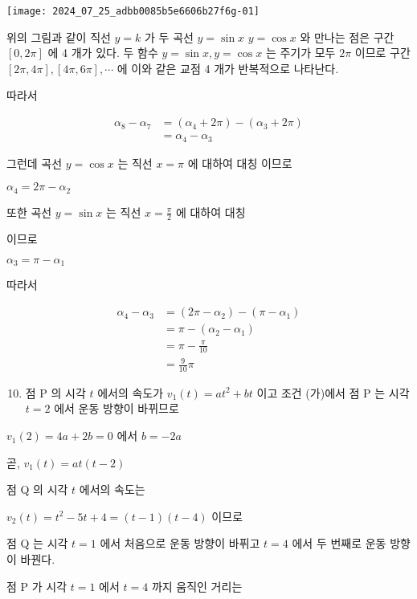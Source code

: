 \documentclass[10pt]{article}
\begin{document}
\begin{center}
\texttt{[image: 2024\_07\_25\_adbb0085b5e6606b27f6g-01]}
\end{center}

위의 그림과 같이 직선 $y=k$ 가 두 곡선 $y=\sin x$ $y=\cos x$ 와 만나는 점은 구간 $[0,2 \pi]$ 에 4 개가 있다. 두 함수 $y=\sin x, y=\cos x$ 는 주기가 모두 $2 \pi$ 이므로 구간 $[2 \pi, 4 \pi],[4 \pi, 6 \pi], \cdots$ 에 이와 같은 교점 4 개가 반복적으로 나타난다.

따라서

\[
\begin{aligned}
\alpha_{8}-\alpha_{7} & =\left(\alpha_{4}+2 \pi\right)-\left(\alpha_{3}+2 \pi\right) \\
& =\alpha_{4}-\alpha_{3}
\end{aligned}
\]

그런데 곡선 $y=\cos x$ 는 직선 $x=\pi$ 에 대하여 대칭 이므로

$\alpha_{4}=2 \pi-\alpha_{2}$

또한 곡선 $y=\sin x$ 는 직선 $x=\frac{\pi}{2}$ 에 대하여 대칭

이므로

$\alpha_{3}=\pi-\alpha_{1}$

따라서

\[
\begin{aligned}
\alpha_{4}-\alpha_{3} & =\left(2 \pi-\alpha_{2}\right)-\left(\pi-\alpha_{1}\right) \\
& =\pi-\left(\alpha_{2}-\alpha_{1}\right) \\
& =\pi-\frac{\pi}{10} \\
& =\frac{9}{10} \pi
\end{aligned}
\]

\begin{enumerate}
  \setcounter{enumi}{9}
  \item 점 P 의 시각 $t$ 에서의 속도가 $v_{1}(t)=a t^{2}+b t$ 이고 조건 (가)에서 점 P 는 시각 $t=2$ 에서 운동 방향이 바뀌므로
\end{enumerate}

$v_{1}(2)=4 a+2 b=0$ 에서 $b=-2 a$

곧, $v_{1}(t)=a t(t-2)$

점 Q 의 시각 $t$ 에서의 속도는

$v_{2}(t)=t^{2}-5 t+4=(t-1)(t-4)$ 이므로

점 Q 는 시각 $t=1$ 에서 처음으로 운동 방향이 바퓌고 $t=4$ 에서 두 번째로 운동 방향이 바꿘다.

점 P 가 시각 $t=1$ 에서 $t=4$ 까지 움직인 거리는
\end{document}
